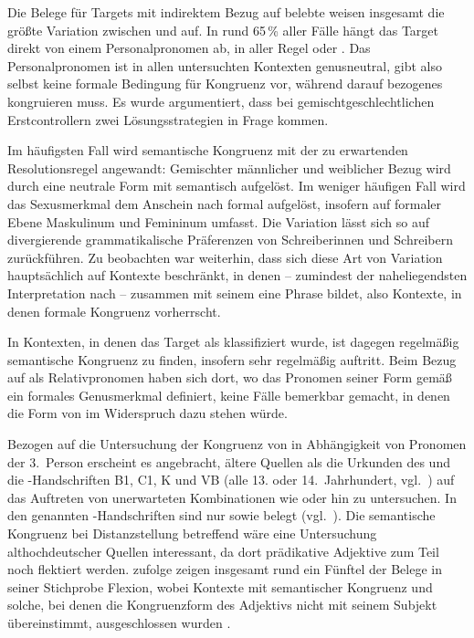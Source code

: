 Die Belege für Targets mit indirektem Bezug auf belebte
 weisen insgesamt die größte Variation zwischen
 und  auf. In rund 65\,\% aller Fälle hängt das Target
direkt von einem Personalpronomen ab, in aller Regel  oder .
Das Personalpronomen ist in allen untersuchten Kontexten
genusneutral, gibt also selbst keine formale Bedingung für
Kongruenz vor, während darauf bezogenes  kongruieren muss. Es wurde
argumentiert, dass bei gemischtgeschlechtlichen
Erstcontrollern zwei Lösungsstrategien in Frage kommen.

Im häufigsten Fall wird semantische Kongruenz mit der zu erwartenden
Resolutionsregel angewandt: Gemischter männlicher und weiblicher Bezug wird
durch eine neutrale Form mit \mbox{} semantisch aufgelöst. Im weniger
häufigen Fall wird das Sexusmerkmal dem Anschein nach formal aufgelöst,
insofern  auf formaler Ebene Maskulinum und Femininum umfasst. Die
Variation lässt sich so auf divergierende grammatikalische Präferenzen von
Schreiberinnen und Schreibern zurück\-führen. Zu beobachten war weiterhin, dass
sich diese Art von Variation hauptsächlich auf Kontexte beschränkt, in denen
 -- zumindest der naheliegendsten Interpretation nach -- zusammen
mit seinem  eine Phrase bildet, also Kontexte, in denen formale
Kongruenz vorherrscht.

In Kontexten, in denen das Target als  klassifiziert
wurde, ist dagegen regelmäßig semantische Kongruenz zu finden, insofern sehr
regelmäßig  auftritt. Beim Bezug auf  als
Relativpronomen haben sich dort, wo das Pronomen seiner Form gemäß ein formales
Genusmerkmal definiert, keine Fälle bemerkbar gemacht, in
denen die Form von  im Widerspruch dazu stehen würde.

Bezogen auf die Untersuchung der Kongruenz von  in Abhängigkeit von
Pro\-nomen der 3.~Person erscheint es angebracht, ältere Quellen
als die Urkunden des \CAO{} und die \KC{}-Handschriften B1, C1, K und VB (alle
13. oder 14.~Jahrhundert, vgl.~) auf das Auftreten von
unerwarteten Kombinationen wie  oder  hin zu
untersuchen. In den genannten \KC{}-Handschriften sind nur 
sowie  belegt (vgl.~). Die
semantische Kongruenz bei Distanz\-stellung betreffend wäre eine Untersuchung
althochdeutscher Quellen interessant, da dort prädikative
Adjektive zum Teil noch flektiert werden.
\citet[310--311]{fleischer2007} zufolge zeigen insgesamt rund ein Fünftel der
Belege in seiner Stichprobe Flexion, wobei Kontexte mit semantischer Kongruenz
und solche, bei denen die Kongruenzform des Adjektivs
nicht mit seinem Subjekt übereinstimmt, ausgeschlossen wurden
\autocite[304]{fleischer2007}.

